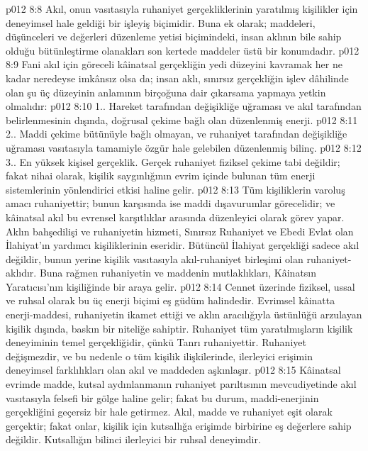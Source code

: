 \vs p012 8:8 Akıl, onun vasıtasıyla ruhaniyet gerçekliklerinin yaratılmış kişilikler için deneyimsel hale geldiği bir işleyiş biçimidir. Buna ek olarak; maddeleri, düşünceleri ve değerleri düzenleme yetisi biçimindeki, insan aklının bile sahip olduğu bütünleştirme olanakları son kertede maddeler üstü bir konumdadır.
\vs p012 8:9 Fani akıl için göreceli kâinatsal gerçekliğin yedi düzeyini kavramak her ne kadar neredeyse imkânsız olsa da; insan aklı, sınırsız gerçekliğin işlev dâhilinde olan şu üç düzeyinin anlamının birçoğuna dair çıkarsama yapmaya yetkin olmalıdır:
\vs p012 8:10 1.\bibnobreakspace {}. Hareket tarafından değişikliğe uğraması ve akıl tarafından belirlenmesinin dışında, doğrusal çekime bağlı olan düzenlenmiş enerji.
\vs p012 8:11 2.\bibnobreakspace {}. Maddi çekime bütünüyle bağlı olmayan, ve ruhaniyet tarafından değişikliğe uğraması vasıtasıyla tamamiyle özgür hale gelebilen düzenlenmiş bilinç.
\vs p012 8:12 3.\bibnobreakspace {}. En yüksek kişisel gerçeklik. Gerçek ruhaniyet fiziksel çekime tabi değildir; fakat nihai olarak, kişilik saygınlığının evrim içinde bulunan tüm enerji sistemlerinin yönlendirici etkisi haline gelir.
\vs p012 8:13 Tüm kişiliklerin varoluş amacı ruhaniyettir; bunun karşısında ise maddi dışavurumlar görecelidir; ve kâinatsal akıl bu evrensel karşıtlıklar arasında düzenleyici olarak görev yapar. Aklın bahşedilişi ve ruhaniyetin hizmeti, Sınırsız Ruhaniyet ve Ebedi Evlat olan İlahiyat’ın yardımcı kişiliklerinin eseridir. Bütüncül İlahiyat gerçekliği sadece akıl değildir, bunun yerine kişilik vasıtasıyla akıl\hyp{}ruhaniyet birleşimi olan ruhaniyet\hyp{}aklıdır. Buna rağmen ruhaniyetin ve maddenin mutlaklıkları, Kâinatsın Yaratıcısı’nın kişiliğinde bir araya gelir.
\vs p012 8:14 Cennet üzerinde fiziksel, ussal ve ruhsal olarak bu üç enerji biçimi eş güdüm halindedir. Evrimsel kâinatta enerji\hyp{}maddesi, ruhaniyetin ikamet ettiği ve aklın aracılığıyla üstünlüğü arzulayan kişilik dışında, baskın bir niteliğe sahiptir. Ruhaniyet tüm yaratılmışların kişilik deneyiminin temel gerçekliğidir, çünkü Tanrı ruhaniyettir. Ruhaniyet değişmezdir, ve bu nedenle o tüm kişilik ilişkilerinde, ilerleyici erişimin deneyimsel farklılıkları olan akıl ve maddeden aşkınlaşır.
\vs p012 8:15 Kâinatsal evrimde madde, kutsal aydınlanmanın ruhaniyet parıltısının mevcudiyetinde akıl vasıtasıyla felsefi bir gölge haline gelir; fakat bu durum, maddi\hyp{}enerjinin gerçekliğini geçersiz bir hale getirmez. Akıl, madde ve ruhaniyet eşit olarak gerçektir; fakat onlar, kişilik için kutsallığa erişimde birbirine eş değerlere sahip değildir. Kutsallığın bilinci ilerleyici bir ruhsal deneyimdir.
